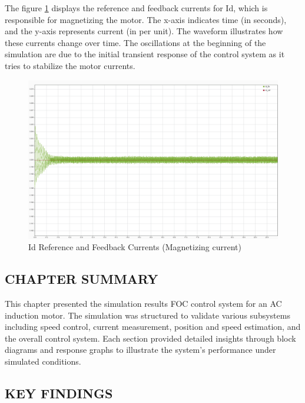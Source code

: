 The figure \ref{fig:current_response_Id_ref_fb}  displays the reference and feedback currents for Id, which is responsible for magnetizing the motor. The x-axis indicates time (in seconds), and the y-axis represents current (in per unit). The waveform illustrates how these currents change over time. The oscillations at the beginning of the simulation are due to the initial transient response of the control system as it tries to stabilize the motor currents.

\begin{figure}
	\centering
	\includegraphics[width=5in]{sections/section3/images/simulationResutls/Id_ref_fb.png}
	\caption{Id Reference and Feedback Currents (Magnetizing current)}
	\label{fig:current_response_Id_ref_fb}
\end{figure}



\subsection{CHAPTER SUMMARY}

This chapter presented the simulation results FOC control system for an AC induction motor. The simulation was structured to validate various subsystems including speed control, current measurement, position and speed estimation, and the overall control system. Each section provided detailed insights through block diagrams and response graphs to illustrate the system's performance under simulated conditions.

\subsection{KEY FINDINGS}

